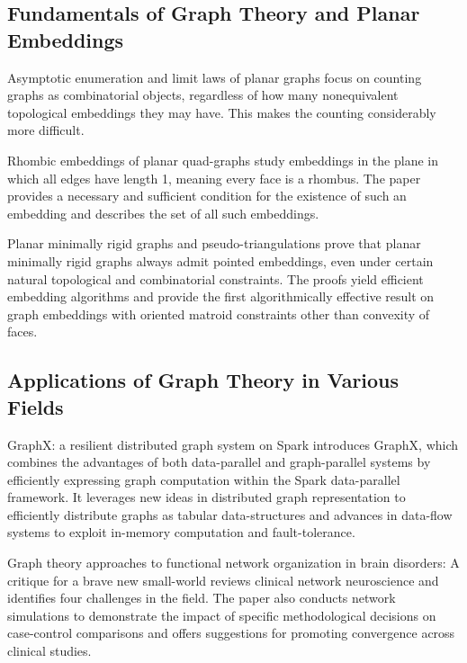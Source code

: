 \documentclass{article}
\begin{document}
\subsection{Fundamentals of Graph Theory and Planar Embeddings}

Asymptotic enumeration and limit laws of planar graphs \cite{Gimenez2005AsymptoticEA} focus on counting graphs as combinatorial objects, regardless of how many nonequivalent topological embeddings they may have. This makes the counting considerably more difficult.

Rhombic embeddings of planar quad-graphs \cite{Kenyon2004RhombicEO} study embeddings in the plane in which all edges have length 1, meaning every face is a rhombus. The paper provides a necessary and sufficient condition for the existence of such an embedding and describes the set of all such embeddings.

Planar minimally rigid graphs and pseudo-triangulations \cite{Haas2003PlanarMR} prove that planar minimally rigid graphs always admit pointed embeddings, even under certain natural topological and combinatorial constraints. The proofs yield efficient embedding algorithms and provide the first algorithmically effective result on graph embeddings with oriented matroid constraints other than convexity of faces.

\subsection{Applications of Graph Theory in Various Fields}

GraphX: a resilient distributed graph system on Spark \cite{Xin2013GraphXAR} introduces GraphX, which combines the advantages of both data-parallel and graph-parallel systems by efficiently expressing graph computation within the Spark data-parallel framework. It leverages new ideas in distributed graph representation to efficiently distribute graphs as tabular data-structures and advances in data-flow systems to exploit in-memory computation and fault-tolerance.

Graph theory approaches to functional network organization in brain disorders: A critique for a brave new small-world \cite{Hallquist2018GraphTA} reviews clinical network neuroscience and identifies four challenges in the field. The paper also conducts network simulations to demonstrate the impact of specific methodological decisions on case-control comparisons and offers suggestions for promoting convergence across clinical studies.
\end{document}
